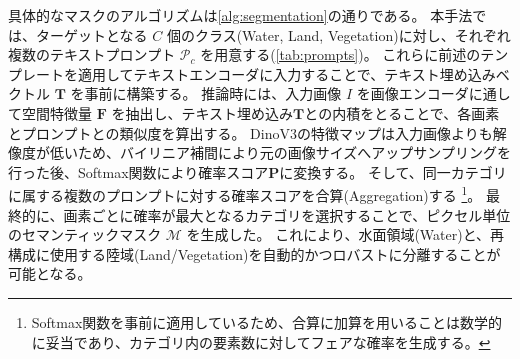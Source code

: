 具体的なマスクのアルゴリズムは\cref{alg:segmentation}の通りである。
本手法では、ターゲットとなる $C$ 個のクラス(Water, Land, Vegetation)に対し、それぞれ複数のテキストプロンプト $\mathcal{P}_c$ を用意する(\cref{tab:prompts})。
これらに前述のテンプレートを適用してテキストエンコーダに入力することで、テキスト埋め込みベクトル $\mathbf{T}$ を事前に構築する。
推論時には、入力画像 $I$ を画像エンコーダに通して空間特徴量 $\mathbf{F}$ を抽出し、テキスト埋め込み$\mathbf{T}$との内積をとることで、各画素とプロンプトとの類似度を算出する。
DinoV3の特徴マップは入力画像よりも解像度が低いため、バイリニア補間により元の画像サイズへアップサンプリングを行った後、Softmax関数により確率スコア$\mathbf{P}$に変換する。
そして、同一カテゴリに属する複数のプロンプトに対する確率スコアを合算(Aggregation)する
\footnote{Softmax関数を事前に適用しているため、合算に加算を用いることは数学的に妥当であり、カテゴリ内の要素数に対してフェアな確率を生成する。}。
最終的に、画素ごとに確率が最大となるカテゴリを選択することで、ピクセル単位のセマンティックマスク $\mathcal{M}$ を生成した。
これにより、水面領域(Water)と、再構成に使用する陸域(Land/Vegetation)を自動的かつロバストに分離することが可能となる。


